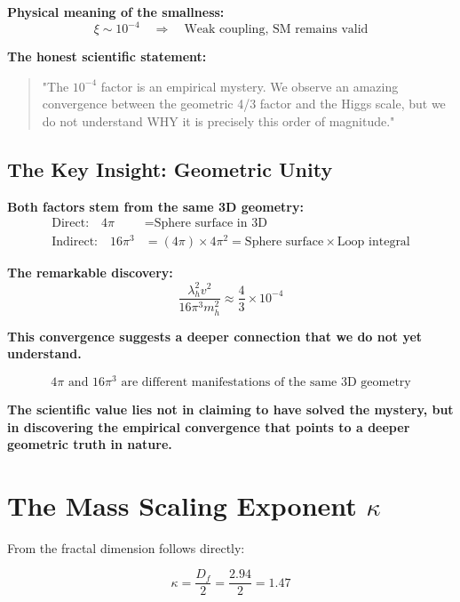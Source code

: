 \documentclass[12pt,a4paper]{article}
\begin{document}
\textbf{Physical meaning of the smallness:}
\begin{equation}
	\xi \sim 10^{-4} \quad \Rightarrow \quad \text{Weak coupling, SM remains valid}
\end{equation}

\textbf{The honest scientific statement:}
\begin{quote}
	"The $10^{-4}$ factor is an empirical mystery. We observe an amazing convergence between the geometric 4/3 factor and the Higgs scale, but we do not understand WHY it is precisely this order of magnitude."
\end{quote}

\subsection{The Key Insight: Geometric Unity}
\label{subsec:key_insight}

\textbf{Both factors stem from the same 3D geometry:}
\begin{align}
	\text{Direct:} \quad 4\pi &= \text{Sphere surface in 3D} \\
	\text{Indirect:} \quad 16\pi^3 &= (4\pi) \times 4\pi^2 = \text{Sphere surface} \times \text{Loop integral}
\end{align}

\textbf{The remarkable discovery:}
\begin{equation}
	\frac{\lambda_h^2 v^2}{16\pi^3 m_h^2} \approx \frac{4}{3} \times 10^{-4}
\end{equation}

\textbf{This convergence suggests a deeper connection that we do not yet understand.}

\begin{equation}
	\boxed{4\pi \text{ and } 16\pi^3 \text{ are different manifestations of the same 3D geometry}}
\end{equation}

\textbf{The scientific value lies not in claiming to have solved the mystery, but in discovering the empirical convergence that points to a deeper geometric truth in nature.}
	\section{The Mass Scaling Exponent $\kappa$}
	
	From the fractal dimension follows directly:
	
	\begin{equation}
		\kappa = \frac{D_f}{2} = \frac{2.94}{2} = 1.47
	\end{equation}
	
\end{document}
